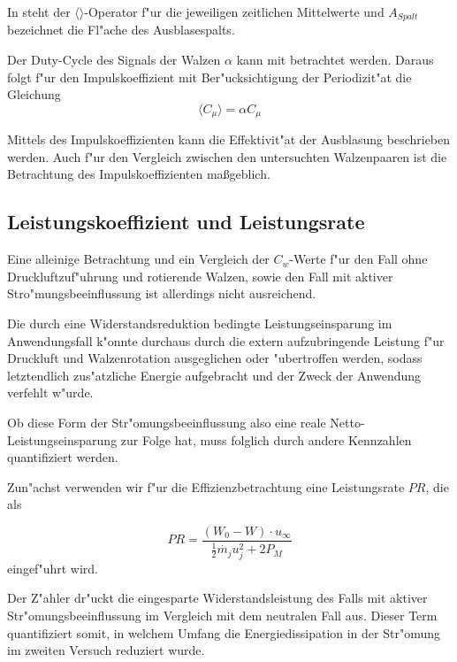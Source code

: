 In  steht der $\langle{}\rangle$-Operator f"ur die jeweiligen zeitlichen Mittelwerte und $A_{Spalt}$ bezeichnet die Fl"ache des Ausblasespalts.

Der Duty-Cycle des Signals der Walzen $\alpha$ kann mit betrachtet werden. Daraus folgt f"ur den Impulskoeffizient mit Ber"ucksichtigung der Periodizit"at die Gleichung
	\begin{equation}
	\label{eq:momentum-coeff-oscill-alpha}
		\langle{C_{\mu}}\rangle = \alpha C_{\mu}
	\end{equation}	 



Mittels des Impulskoeffizienten kann die Effektivit"at der Ausblasung beschrieben werden.
Auch f"ur den Vergleich zwischen den untersuchten Walzenpaaren ist die Betrachtung des Impulskoeffizienten ma\ss{}geblich.

\subsection{Leistungskoeffizient und Leistungsrate}
Eine alleinige Betrachtung und ein Vergleich der $C_w$-Werte f"ur den Fall ohne Druckluftzuf"uhrung und rotierende Walzen, sowie den Fall mit aktiver Stro"mungsbeeinflussung ist allerdings nicht ausreichend.

Die durch eine Widerstandsreduktion bedingte Leistungseinsparung im Anwendungsfall k"onnte durchaus durch die extern aufzubringende Leistung f"ur Druckluft und Walzenrotation ausgeglichen oder "ubertroffen werden, sodass letztendlich zus"atzliche Energie aufgebracht und der Zweck der Anwendung verfehlt w"urde.

Ob diese Form der Str"omungsbeeinflussung also eine reale Netto-Leistungseinsparung zur Folge hat, muss folglich durch andere Kennzahlen quantifiziert werden.

Zun"achst verwenden wir f"ur die Effizienzbetrachtung eine Leistungsrate $PR$, die als 

	\begin{equation}
	\label{eq:leistungsrate}
		PR = \frac{(W_0 - W)\cdot u_{\infty}}{\frac{1}{2} \dot{m_j} u_j^2 + 2     P_M}
	\end{equation}
eingef"uhrt wird.

Der Z"ahler dr"uckt die eingesparte Widerstandsleistung des Falls mit aktiver Str"omungsbeeinflussung im Vergleich mit dem neutralen Fall aus.
Dieser Term quantifiziert somit, in welchem Umfang die Energiedissipation in der Str"omung im zweiten Versuch reduziert wurde.

